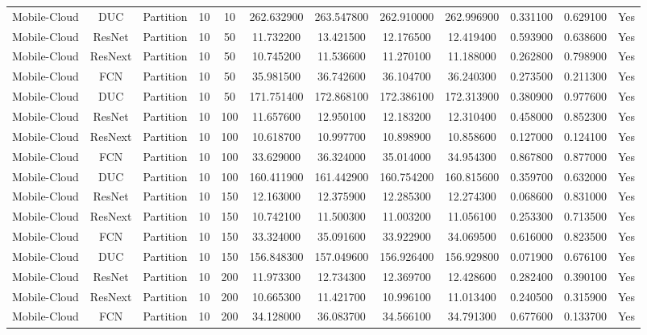 \begin{tabular}{|c||c||c||c||c||c||c||c||c||c||c||c|}
Mobile-Cloud & DUC & Partition & 10 & 10 & 262.632900 & 263.547800 & 262.910000 & 262.996900 & 0.331100 & 0.629100 & Yes \\
Mobile-Cloud & ResNet & Partition & 10 & 50 & 11.732200 & 13.421500 & 12.176500 & 12.419400 & 0.593900 & 0.638600 & Yes \\
Mobile-Cloud & ResNext & Partition & 10 & 50 & 10.745200 & 11.536600 & 11.270100 & 11.188000 & 0.262800 & 0.798900 & Yes \\
Mobile-Cloud & FCN & Partition & 10 & 50 & 35.981500 & 36.742600 & 36.104700 & 36.240300 & 0.273500 & 0.211300 & Yes \\
Mobile-Cloud & DUC & Partition & 10 & 50 & 171.751400 & 172.868100 & 172.386100 & 172.313900 & 0.380900 & 0.977600 & Yes \\
Mobile-Cloud & ResNet & Partition & 10 & 100 & 11.657600 & 12.950100 & 12.183200 & 12.310400 & 0.458000 & 0.852300 & Yes \\
Mobile-Cloud & ResNext & Partition & 10 & 100 & 10.618700 & 10.997700 & 10.898900 & 10.858600 & 0.127000 & 0.124100 & Yes \\
Mobile-Cloud & FCN & Partition & 10 & 100 & 33.629000 & 36.324000 & 35.014000 & 34.954300 & 0.867800 & 0.877000 & Yes \\
Mobile-Cloud & DUC & Partition & 10 & 100 & 160.411900 & 161.442900 & 160.754200 & 160.815600 & 0.359700 & 0.632000 & Yes \\
Mobile-Cloud & ResNet & Partition & 10 & 150 & 12.163000 & 12.375900 & 12.285300 & 12.274300 & 0.068600 & 0.831000 & Yes \\
Mobile-Cloud & ResNext & Partition & 10 & 150 & 10.742100 & 11.500300 & 11.003200 & 11.056100 & 0.253300 & 0.713500 & Yes \\
Mobile-Cloud & FCN & Partition & 10 & 150 & 33.324000 & 35.091600 & 33.922900 & 34.069500 & 0.616000 & 0.823500 & Yes \\
Mobile-Cloud & DUC & Partition & 10 & 150 & 156.848300 & 157.049600 & 156.926400 & 156.929800 & 0.071900 & 0.676100 & Yes \\
Mobile-Cloud & ResNet & Partition & 10 & 200 & 11.973300 & 12.734300 & 12.369700 & 12.428600 & 0.282400 & 0.390100 & Yes \\
Mobile-Cloud & ResNext & Partition & 10 & 200 & 10.665300 & 11.421700 & 10.996100 & 11.013400 & 0.240500 & 0.315900 & Yes \\
Mobile-Cloud & FCN & Partition & 10 & 200 & 34.128000 & 36.083700 & 34.566100 & 34.791300 & 0.677600 & 0.133700 & Yes \\

\end{tabular}
